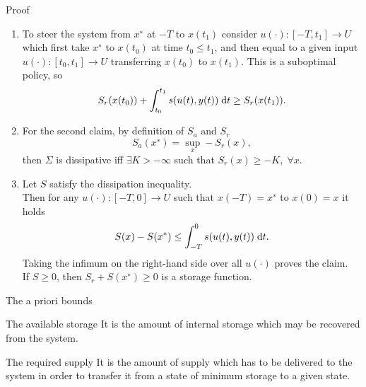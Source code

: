 \documentclass[aspectratio=169]{beamer}
\begin{document}
\begin{frame}{Proof}
	\begin{enumerate}
		\item To steer the system from $x^∗$ at $-T$ to $x(t_1)$  consider $u(\cdot) : [-T, t_1] \rightarrow U$ which first take $x^∗$ to $x(t_0)$ at time $t_0 \le t_1$, and then equal to a given input $u(\cdot) : [t_0 , t_1] \rightarrow U$ transferring $x(t_0) $ to $x(t_1)$. This is a suboptimal policy, so
		\begin{equation*}
			S_r(x(t_0)) + \int_{t_0}^{t_1} s(u(t), y(t)) \d t \ge S_r(x(t_1)).
		\end{equation*}
	\item For the second claim, by definition of $S_a$ and $S_r$
	\begin{equation*}
		S_a(x^∗) = \sup_x −S_r(x),
	\end{equation*}
	then $\Sigma$ is dissipative iff $\exists K > -\infty$ such that $S_r(x) \ge -K, \; \forall x$.
	\item Let $S$ satisfy the dissipation inequality. \\
	Then for any $u(\cdot) : [-T, 0] \rightarrow U$ such that $x(-T) = x^∗$ to $x(0) = x$ it holds
	\begin{equation*}
		S(x) - S(x^*) \le \int_{-T}^{0} s(u(t), y(t)) \d t.
	\end{equation*}
	Taking the infimum on the right-hand side over all $u(\cdot)$ proves the claim. \\
	If $S \ge 0$, then $S_r + S(x^∗) \ge 0$ is a storage function. 
	\end{enumerate}
	
\end{frame}

\begin{frame}{The a priori bounds}
	\begin{block}{The available storage}
	It is the amount of internal storage which may be recovered from the system.
	\end{block}

	\begin{block}{The required supply}
		It is the amount of supply which has to be delivered to the system in order to transfer it from a state of minimum storage to a given state.
	\end{block}
	 
\end{frame}
\end{document}
